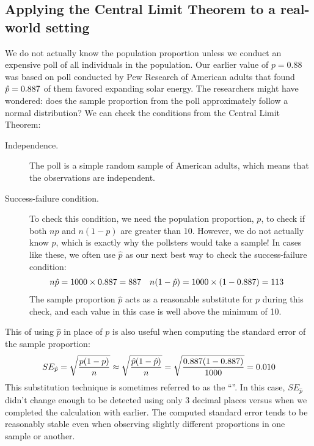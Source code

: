 \subsection{Applying the Central Limit Theorem to
    a real-world setting}
\label{apply_clt_real_world_setting}

We do not actually know the population proportion
unless we conduct an expensive poll of all individuals
in the population.
Our earlier value of $p = 0.88$ was based on poll
conducted by Pew Research of \pewsolarpollsize{}
American adults that found
$\hat{p} = 0.887{}$ of them favored
expanding solar energy.
The researchers might have wondered:
does the sample proportion from the poll approximately
follow a normal distribution?
We can check the conditions from the Central Limit Theorem:
\begin{description}
\item[Independence.] The poll is a simple random sample of
    American adults, which means that the observations are
    independent.
\item[Success-failure condition.] To check this condition,
    we need the population proportion, $p$, to check if both
    $np$ and $n(1-p)$ are greater than 10.
    However, we do not actually know $p$, which
    is exactly why the pollsters would take a sample!
    In cases like these, we often use $\hat{p}$
    as our next best way to check the success-failure condition:
    \begin{align*}
    n\hat{p}
        &= 1000{} \times 0.887{}
        = 887{}
    &n (1 - \hat{p})
        &= 1000{} \times (1 - 0.887{})
        = 113{}
    \end{align*}
    The sample proportion $\hat{p}$ acts as
    a reasonable substitute for $p$ during this check,
    and each value in this case is well above the minimum of 10.
\end{description}

This  of using $\hat{p}$ in
place of $p$ is also useful when computing the standard error
of the sample proportion:
\begin{align*}
SE_{\hat{p}}
    = \sqrt{\frac{p (1 - p)}{n}}
    \approx \sqrt{\frac{\hat{p} (1 - \hat{p})}{n}}
    = \sqrt{\frac{0.887{}
        (1 - 0.887{})}{1000{}}}
    = 0.010{}
\end{align*}
This substitution technique is sometimes
referred to as the ``''.
In this case, $SE_{\hat{p}}$ didn't change enough to
be detected using only 3 decimal places
versus when we completed the calculation with
\pewsolarparprop{} earlier.
The computed standard error tends to be reasonably stable
even when observing slightly different proportions in one
sample or another.


